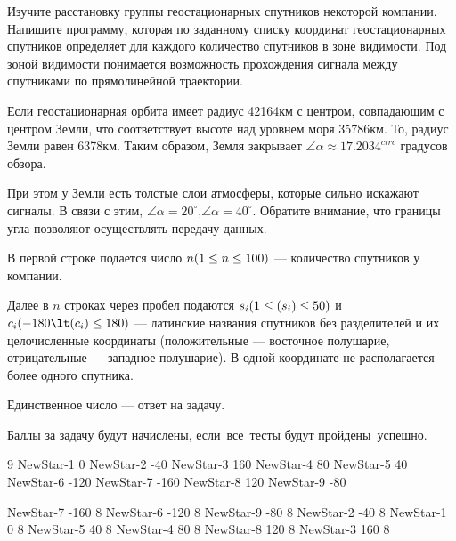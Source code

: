 
Изучите расстановку группы геостационарных спутников некоторой компании. Напишите программу, которая по заданному списку координат геостационарных спутников определяет для каждого количество спутников в зоне видимости. Под зоной видимости понимается возможность прохождения сигнала между спутниками по прямолинейной траектории.

Если геостационарная орбита имеет радиус 42164км с центром, совпадающим с центром Земли, что соответствует высоте над уровнем моря 35786км. То, радиус Земли равен 6378км. Таким образом, Земля закрывает $\angle \alpha \approx 17.2034^{circ}$ градусов обзора.


При этом у Земли есть толстые слои атмосферы, которые сильно искажают сигналы. В связи с этим,  $\angle \alpha = 20^{\circ}$,$\angle \alpha = 40^{\circ}$. Обратите внимание, что границы угла позволяют осуществлять передачу данных.


В первой строке подается число $n\space (1\leq n \leq 100)$ — количество спутников у компании.

Далее в $n$ строках через пробел подаются $s_i\space(1\leq(s_i)\leq 50)$ и $c_i\space(-180\lt (c_i)\leq 180)$ — латинские названия спутников без разделителей и их целочисленные координаты (положительные — восточное полушарие, отрицательные — западное полушарие). В одной координате не располагается более одного спутника.

\outputfmtSection

Единственное число — ответ на задачу.

\markSection

Баллы за задачу будут начислены, если все тесты будут пройдены успешно.


\begin{myverbbox}[\small]{\vinput}
    9
    NewStar-1 0
    NewStar-2 -40
    NewStar-3 160
    NewStar-4 80
    NewStar-5 40
    NewStar-6 -120
    NewStar-7 -160
    NewStar-8 120
    NewStar-9 -80
\end{myverbbox}
\begin{myverbbox}[\small]{\voutput}
    NewStar-7 -160 8
    NewStar-6 -120 8
    NewStar-9 -80 8
    NewStar-2 -40 8
    NewStar-1 0 8
    NewStar-5 40 8
    NewStar-4 80 8
    NewStar-8 120 8
    NewStar-3 160 8
\end{myverbbox}

